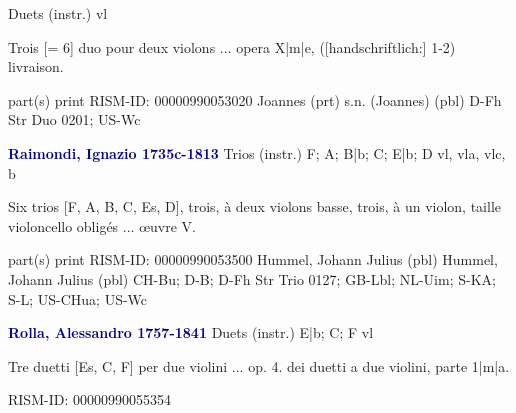 \documentclass[twocolumn]{book}
\begin{document}
\newline Duets (instr.)    
 vl
\newline \begin{itshape}Trois [= 6] duo pour deux violons ... opera X|m|e, ([handschriftlich:] 1-2) livraison.\end{itshape} 
\newline \textcolor{darkblue}{}  part(s)  
\newline print
\newline RISM-ID: 00000990053020
\newline Joannes  (prt)
\newline s.n. (Joannes)  (pbl)
\newline D-Fh  Str Duo 0201; US-Wc
\newline \par \vspace{7pt} \textcolor{darkblue}{\textbf{Raimondi, Ignazio  1735c-1813}}
\newline Trios (instr.)  F; A; B|b; C; E|b; D  
 vl, vla, vlc, b
\newline \begin{itshape}Six trios [F, A, B, C, Es, D], trois, à deux violons  basse,  trois, à un violon, taille  violoncello obligés ... œuvre V.\end{itshape} 
\newline \textcolor{darkblue}{}  part(s)  
\newline print
\newline RISM-ID: 00000990053500
\newline Hummel, Johann Julius  (pbl)
\newline Hummel, Johann Julius  (pbl)
\newline CH-Bu; D-B; D-Fh  Str Trio 0127; GB-Lbl; NL-Uim; S-KA; S-L; US-CHua; US-Wc
\newline \par \vspace{7pt} \textcolor{darkblue}{\textbf{Rolla, Alessandro  1757-1841}}
\newline Duets (instr.)  E|b; C; F  
 vl
\newline \begin{itshape}Tre duetti [Es, C, F] per due violini ... op. 4. dei duetti a due violini, parte 1|m|a.\end{itshape} 
\newline RISM-ID: 00000990055354
\end{document}
